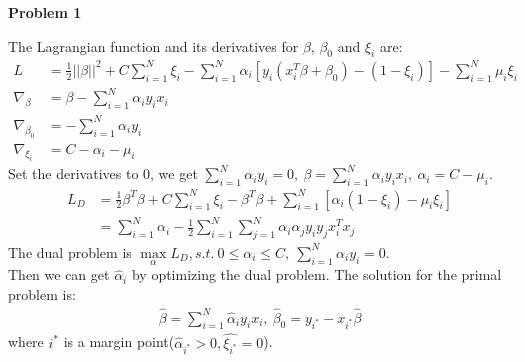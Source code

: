 \documentclass[UTF8,12pt]{article}
\newenvironment{problem}[2][Problem]
{ \begin{mdframed}[backgroundcolor=gray!20] \textbf{#1 #2}}
	{  \end{mdframed}}
\newenvironment{answer}
{%
}
{}
\newenvironment{eq}
{
	\begin{equation}
		\begin{aligned}\nonumber
}
{
		\end{aligned}
	\end{equation}
}
\begin{document}
\renewcommand{\qed}{\quad\qedsymbol}
\setlength{\parindent}{0pt}

\begin{problem}{1}
\end{problem}
\begin{answer}
	The Lagrangian function and its derivatives
	for $\beta$, $\beta_0$ and $\xi_i$ are:
	\begin{eq}
		L &= \frac{1}{2}||\beta||^2 + C\sum_{i=1}^N \xi_i - \sum_{i=1}^N
		\alpha_i[y_i(x_i^T\beta + \beta_0)-(1-\xi_i)] - 
		\sum_{i=1}^N \mu_i\xi_i\\
		\nabla_\beta &= \beta - \sum_{i=1}^N\alpha_i y_ix_i\\
		\nabla_{\beta_0} &= -\sum_{i=1}^N \alpha_i  y_i\\
		\nabla_{\xi_i} &= C- \alpha_i -\mu_i
	\end{eq}
	Set the derivatives to $0$, we get $\sum_{i=1}^N \alpha_i y_i=0,\ 
	\beta= \sum_{i=1}^N\alpha_i y_ix_i,\ \alpha_i = C-\mu_i$.
\begin{eq}
	L_D &= \frac{1}{2}\beta^T\beta + C\sum_{i=1}^N \xi_i -\beta^T\beta +
	\sum_{i=1}^N[\alpha_i(1-\xi_i)-\mu_i\xi_i]\\
	&= \sum_{i=1}^N \alpha_i - \frac{1}{2}\sum_{i=1}^N\sum_{j=1}^N 
	\alpha_i\alpha_j y_i y_j x_i^T x_j
\end{eq}
	The dual problem is $\max\limits_{\alpha}L_D, s.t.\ 
	0\le \alpha_i\le C,\ \sum_{i=1}^N \alpha_iy_i=0$.\\
	Then we can get $\hat{\alpha}_i$ by optimizing the dual problem. The solution 
	for the primal problem is:
	\begin{eq}
		\hat{\beta} = \sum_{i=1}^N \hat{\alpha}_i y_i x_i,\ 
		\hat{\beta}_0 = y_{i^*}-x_{i^*}\hat{\beta}
	\end{eq}
	where $i^*$ is a margin point($\hat{\alpha}_{i^*}>0, \hat{\xi_{i^*}}=0$).
\end{answer}
\end{document}
